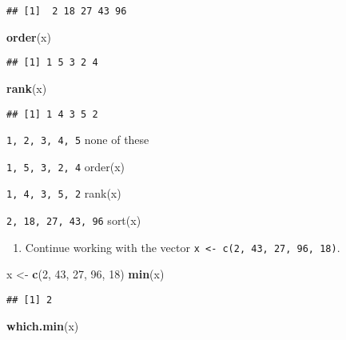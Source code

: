 \documentclass[]{article}
\newenvironment{Shaded}{\begin{snugshade}}{\end{snugshade}}
\newcommand{\DecValTok}[1]{\textcolor[rgb]{0.00,0.00,0.81}{#1}}
\newcommand{\KeywordTok}[1]{\textcolor[rgb]{0.13,0.29,0.53}{\textbf{#1}}}
\newcommand{\NormalTok}[1]{#1}
\newcommand{\StringTok}[1]{\textcolor[rgb]{0.31,0.60,0.02}{#1}}
\providecommand{\tightlist}{%
  \setlength{\itemsep}{0pt}\setlength{\parskip}{0pt}}
\begin{document}
\begin{verbatim}
## [1]  2 18 27 43 96
\end{verbatim}

\begin{Shaded}
\begin{Highlighting}[]
\KeywordTok{order}\NormalTok{(x)}
\end{Highlighting}
\end{Shaded}

\begin{verbatim}
## [1] 1 5 3 2 4
\end{verbatim}

\begin{Shaded}
\begin{Highlighting}[]
\KeywordTok{rank}\NormalTok{(x)}
\end{Highlighting}
\end{Shaded}

\begin{verbatim}
## [1] 1 4 3 5 2
\end{verbatim}

\texttt{1,\ 2,\ 3,\ 4,\ 5} none of these

\texttt{1,\ 5,\ 3,\ 2,\ 4} order(x)

\texttt{1,\ 4,\ 3,\ 5,\ 2} rank(x)

\texttt{2,\ 18,\ 27,\ 43,\ 96} sort(x)

\begin{enumerate}
\def\labelenumi{\arabic{enumi}.}
\setcounter{enumi}{1}
\tightlist
\item
  Continue working with the vector
  \texttt{x\ \textless{}-\ c(2,\ 43,\ 27,\ 96,\ 18)}.
\end{enumerate}

\begin{Shaded}
\begin{Highlighting}[]
\NormalTok{x <-}\StringTok{ }\KeywordTok{c}\NormalTok{(}\DecValTok{2}\NormalTok{, }\DecValTok{43}\NormalTok{, }\DecValTok{27}\NormalTok{, }\DecValTok{96}\NormalTok{, }\DecValTok{18}\NormalTok{)}
\KeywordTok{min}\NormalTok{(x)}
\end{Highlighting}
\end{Shaded}

\begin{verbatim}
## [1] 2
\end{verbatim}

\begin{Shaded}
\begin{Highlighting}[]
\KeywordTok{which.min}\NormalTok{(x)}
\end{Highlighting}
\end{Shaded}
\end{document}
